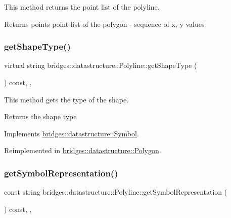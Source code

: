 This method returns the point list of the polyline. 

\begin{DoxyReturn}{Returns}
points point list of the polygon -\/ sequence of x, y values 
\end{DoxyReturn}
\mbox{\label{classbridges_1_1datastructure_1_1_polyline_a5cd5cf2265353c90e91564121583aed1}} 
\subsubsection{\texorpdfstring{get\+Shape\+Type()}{getShapeType()}}
{\footnotesize\ttfamily virtual string bridges\+::datastructure\+::\+Polyline\+::get\+Shape\+Type (\begin{DoxyParamCaption}{ }\end{DoxyParamCaption}) const\hspace{0.3cm}{\ttfamily [inline]}, {\ttfamily [override]}, {\ttfamily [virtual]}}



This method gets the type of the shape. 

\begin{DoxyReturn}{Returns}
the shape type 
\end{DoxyReturn}


Implements \hyperlink{classbridges_1_1datastructure_1_1_symbol_a1fb7cabce2915b103b8474658e8549f8}{bridges\+::datastructure\+::\+Symbol}.



Reimplemented in \hyperlink{classbridges_1_1datastructure_1_1_polygon_a9e575d921e7883815f4505ebb13fffe4}{bridges\+::datastructure\+::\+Polygon}.

\mbox{\label{classbridges_1_1datastructure_1_1_polyline_ab78c7200a23cdd652fd5a9722ac4526d}} 
\subsubsection{\texorpdfstring{get\+Symbol\+Representation()}{getSymbolRepresentation()}}
{\footnotesize\ttfamily const string bridges\+::datastructure\+::\+Polyline\+::get\+Symbol\+Representation (\begin{DoxyParamCaption}{ }\end{DoxyParamCaption}) const\hspace{0.3cm}{\ttfamily [inline]}, {\ttfamily [override]}, {\ttfamily [virtual]}}



